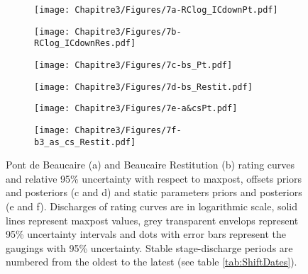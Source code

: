 	
    \begin{figure}[h!]
    \centering
        \begin{subfigure}{0.49\textwidth}
            \centering
            \texttt{[image: Chapitre3/Figures/7a-RClog\_ICdownPt.pdf]}
            \caption{}
            \label{subfig:RcPt}
        \end{subfigure}
        \begin{subfigure}{0.49\textwidth}
            \centering
            \texttt{[image: Chapitre3/Figures/7b-RClog\_ICdownRes.pdf]}
            \caption{}
            \label{subfig:RcRes}
        \end{subfigure}
        
        \begin{subfigure}{0.48\textwidth}
            \centering
            \texttt{[image: Chapitre3/Figures/7c-bs\_Pt.pdf]}
            \caption{}
            \label{subfig:B'sPt}
        \end{subfigure}
        \begin{subfigure}{0.49\textwidth}
            \centering
            \texttt{[image: Chapitre3/Figures/7d-bs\_Restit.pdf]}
            \caption{}
            \label{subfig:B'sRes}
        \end{subfigure}
        
        \begin{subfigure}{0.39\textwidth}
            \centering
            \texttt{[image: Chapitre3/Figures/7e-a\&csPt.pdf]}
            \caption{}
            \label{subfig:a's and c's Pt}
        \end{subfigure}
        \begin{subfigure}{0.49\textwidth}
            \centering
            \texttt{[image: Chapitre3/Figures/7f-b3\_as\_cs\_Restit.pdf]}
            \caption{}
            \label{subfig:bac'sRes}
        \end{subfigure}
        \begin{subfigure}{0.1\textwidth}
            \centering
        \end{subfigure}
        \caption{Pont de Beaucaire (a) and Beaucaire Restitution (b) rating curves and relative 95\% uncertainty with respect to maxpost, offsets priors and posteriors (c and d) and static parameters priors and posteriors (e and f). Discharges of rating curves are in logarithmic scale, solid lines represent maxpost values, grey transparent envelops represent 95\% uncertainty intervals and dots with error bars represent the gaugings with 95\% uncertainty. Stable stage-discharge periods are numbered from the oldest to the latest (see table \ref{tab:ShiftDates}).}
        \label{fig:RcsAndParams}
    \end{figure}
    \FloatBarrier
    
